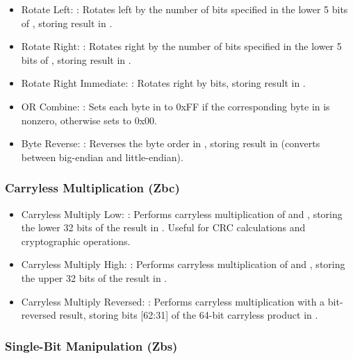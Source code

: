 \documentclass[11pt,pdftex,portrait,letterpaper]{article}
\begin{document}
\begin{itemize}
	\item Rotate Left: : Rotates  left by the number of bits specified in the lower 5 bits of , storing result in .
	\item Rotate Right: : Rotates  right by the number of bits specified in the lower 5 bits of , storing result in .
	\item Rotate Right Immediate: : Rotates  right by  bits, storing result in .
	\item OR Combine: : Sets each byte in  to 0xFF if the corresponding byte in  is nonzero, otherwise sets to 0x00.
	\item Byte Reverse: : Reverses the byte order in , storing result in  (converts between big-endian and little-endian).
\end{itemize}

\subsubsection{Carryless Multiplication (Zbc)}

\begin{itemize}
	\item Carryless Multiply Low: : Performs carryless multiplication of  and , storing the lower 32 bits of the result in . Useful for CRC calculations and cryptographic operations.
	\item Carryless Multiply High: : Performs carryless multiplication of  and , storing the upper 32 bits of the result in .
	\item Carryless Multiply Reversed: : Performs carryless multiplication with a bit-reversed result, storing bits [62:31] of the 64-bit carryless product in .
\end{itemize}

\subsubsection{Single-Bit Manipulation (Zbs)}
\end{document}
